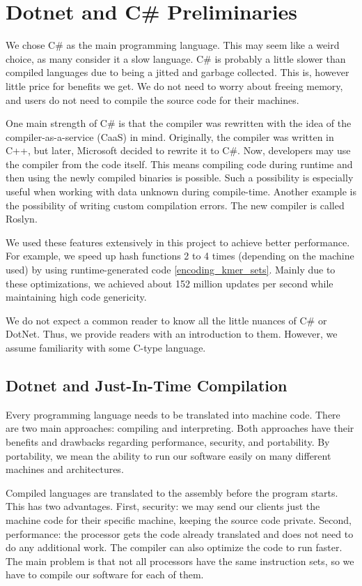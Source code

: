 \chapter{Dotnet and C\# Preliminaries}

We chose C\# as the main programming language. This may seem like a weird choice, as many consider it a slow language. C\# is probably a little slower than compiled languages due to being a jitted and garbage collected. This is, however little price for benefits we get. We do not need to worry about freeing memory, and users do not need to compile the source code for their machines.

One main strength of C\# is that the compiler was rewritten with the idea of the compiler-as-a-service (CaaS) in mind. Originally, the compiler was written in C++, but later, Microsoft decided to rewrite it to C\#. Now, developers may use the compiler from the code itself.  This means compiling code during runtime and then using the newly compiled binaries is possible. Such a possibility is especially useful when working with data unknown during compile-time. Another example is the possibility of writing custom compilation errors. The new compiler is called Roslyn.

We used these features extensively in this project to achieve better performance. For example, we speed up hash functions 2 to 4 times (depending on the machine used) by using runtime-generated code \ref{encoding_kmer_sets}. Mainly due to these optimizations, we achieved about 152 million updates per second while maintaining high code genericity.

We do not expect a common reader to know all the little nuances of C\# or DotNet. Thus, we provide readers with an introduction to them. However, we assume familiarity with some C-type language.

\section{Dotnet and Just-In-Time Compilation}

Every programming language needs to be translated into machine code. There are two main approaches: compiling and interpreting. Both approaches have their benefits and drawbacks regarding performance, security, and portability. By portability, we mean the ability to run our software easily on many different machines and architectures.

Compiled languages are translated to the assembly before the program starts. This has two advantages. First, security: we may send our clients just the machine code for their specific machine, keeping the source code private. Second, performance: the processor gets the code already translated and does not need to do any additional work. The compiler can also optimize the code to run faster. The main problem is that not all processors have the same instruction sets, so we have to compile our software for each of them.

